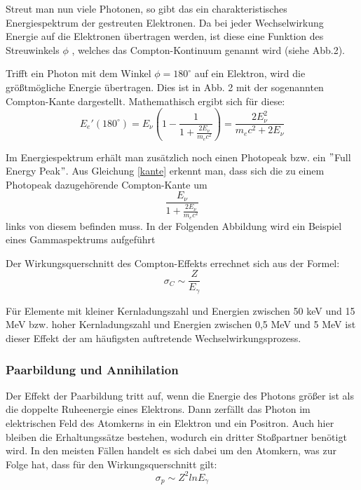 Streut man nun viele Photonen, so gibt das ein charakteristisches Energiespektrum der gestreuten Elektronen. Da bei jeder Wechselwirkung Energie auf die Elektronen übertragen werden, ist diese eine Funktion des Streuwinkels $\phi$ , welches das Compton-Kontinuum genannt wird (siehe Abb.2).


Trifft ein Photon mit dem Winkel $\phi = 180^{\circ}$ auf ein Elektron, wird die größtmögliche Energie übertragen. Dies ist in Abb. 2 mit der sogenannten Compton-Kante dargestellt. Mathemathisch ergibt sich für diese:
	\begin{equation}
	\label{kante}
	E_{e}'(180^{\circ}) = E_{\nu} \left(1-\frac{1}{1+\frac{2E_{\nu}}{m_{e}c^{2}}}\right) = \frac{2E_{\nu}^{2}}{m_{e}c^{2} +2E_{\nu}}
	\end{equation}

Im Energiespektrum erhält man zusätzlich noch einen Photopeak bzw. ein $"$Full Energy Peak$"$. Aus Gleichung \eqref{kante} erkennt man, dass sich die zu einem Photopeak dazugehörende Compton-Kante um 
	\begin{equation}
	\frac{E_{\nu}}{1+\frac{2E_{\nu}}{m_{e}c^{2}}}
	\end{equation}
links von diesem befinden muss. In der Folgenden Abbildung wird ein Beispiel eines Gammaspektrums aufgeführt\\


Der Wirkungsquerschnitt des Compton-Effekts errechnet sich aus der Formel:
	\begin{equation}
	\sigma_{C} \sim \frac{Z}{E_{\gamma}}
	\end{equation}
	
Für Elemente mit kleiner Kernladungszahl und Energien zwischen 50 keV und 15 MeV bzw. hoher Kernladungszahl und Energien zwischen 0,5 MeV und 5 MeV ist dieser Effekt der am häufigsten auftretende Wechselwirkungsprozess.

\subsubsection*{Paarbildung und Annihilation}
Der Effekt der Paarbildung tritt auf, wenn die Energie des Photons größer ist als die doppelte Ruheenergie eines Elektrons. Dann zerfällt das Photon im elektrischen Feld des Atomkerns in ein Elektron und ein Positron. Auch hier bleiben die Erhaltungssätze bestehen, wodurch ein dritter Stoßpartner benötigt wird. In den meisten Fällen handelt es sich dabei um den Atomkern, was zur Folge hat, dass für den Wirkungsquerschnitt gilt:
	\begin{equation}
	\sigma_{p} \sim Z^{2} ln E_{\gamma}
	\end{equation}

